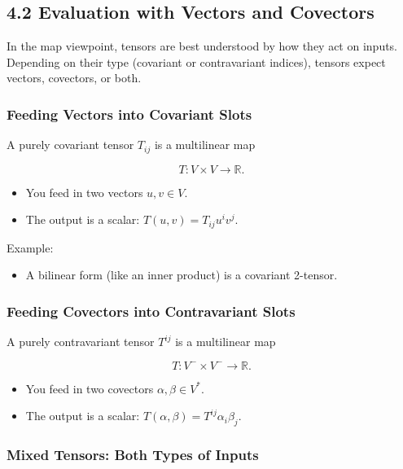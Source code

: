 \documentclass[
  letterpaper,
  DIV=11,
  numbers=noendperiod]{scrreprt}
\providecommand{\tightlist}{%
  \setlength{\itemsep}{0pt}\setlength{\parskip}{0pt}}
\begin{document}
\subsection{4.2 Evaluation with Vectors and
Covectors}\label{evaluation-with-vectors-and-covectors}

In the map viewpoint, tensors are best understood by how they act on
inputs. Depending on their type (covariant or contravariant indices),
tensors expect vectors, covectors, or both.

\subsubsection{Feeding Vectors into Covariant
Slots}\label{feeding-vectors-into-covariant-slots}

A purely covariant tensor \(T_{ij}\) is a multilinear map

\[
T: V \times V \to \mathbb{R}.
\]

\begin{itemize}
\tightlist
\item
  You feed in two vectors \(u, v \in V\).
\item
  The output is a scalar: \(T(u,v) = T_{ij} u^i v^j\).
\end{itemize}

Example:

\begin{itemize}
\tightlist
\item
  A bilinear form (like an inner product) is a covariant 2-tensor.
\end{itemize}

\subsubsection{Feeding Covectors into Contravariant
Slots}\label{feeding-covectors-into-contravariant-slots}

A purely contravariant tensor \(T^{ij}\) is a multilinear map

\[
T: V^- \times V^- \to \mathbb{R}.
\]

\begin{itemize}
\tightlist
\item
  You feed in two covectors \(\alpha, \beta \in V^*\).
\item
  The output is a scalar: \(T(\alpha,\beta) = T^{ij}\alpha_i \beta_j\).
\end{itemize}

\subsubsection{Mixed Tensors: Both Types of
Inputs}\label{mixed-tensors-both-types-of-inputs}
\end{document}
